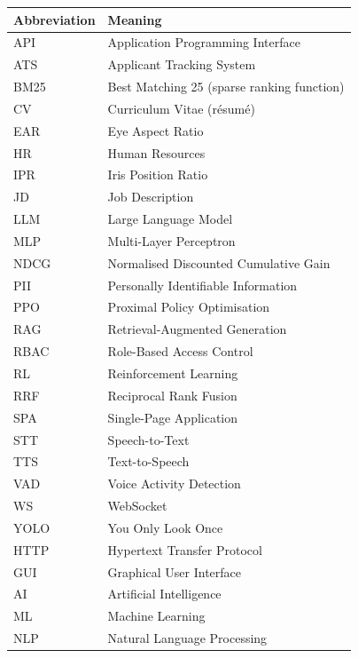 \documentclass[12pt,a4paper,oneside]{report}
\begin{document}
\begin{longtable}{@{}L{2.5cm}L{10cm}@{}}
\toprule
\textbf{Abbreviation} & \textbf{Meaning} \\
\midrule
\endhead
\bottomrule
\endfoot
API   & Application Programming Interface \\
ATS   & Applicant Tracking System \\
BM25  & Best Matching 25 (sparse ranking function) \\
CV    & Curriculum Vitae (résumé) \\
EAR   & Eye Aspect Ratio \\
HR    & Human Resources \\
IPR   & Iris Position Ratio \\
JD    & Job Description \\
LLM   & Large Language Model \\
MLP   & Multi-Layer Perceptron \\
NDCG  & Normalised Discounted Cumulative Gain \\
PII   & Personally Identifiable Information \\
PPO   & Proximal Policy Optimisation \\
RAG   & Retrieval-Augmented Generation \\
RBAC  & Role-Based Access Control \\
RL    & Reinforcement Learning \\
RRF   & Reciprocal Rank Fusion \\
SPA   & Single-Page Application \\
STT   & Speech-to-Text \\
TTS   & Text-to-Speech \\
VAD   & Voice Activity Detection \\
WS    & WebSocket \\
YOLO  & You Only Look Once \\
HTTP  & Hypertext Transfer Protocol \\
GUI   & Graphical User Interface \\
AI    & Artificial Intelligence \\
ML    & Machine Learning \\
NLP   & Natural Language Processing \\
\end{longtable}

\clearpage

\setcounter{page}{1}
\end{document}
